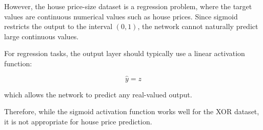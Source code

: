 \documentclass{article}
\begin{document}
However, the house price-size dataset is a regression problem, where the target values are continuous numerical values such as house prices. Since sigmoid restricts the output to the interval $(0,1)$, the network cannot naturally predict large continuous values.

For regression tasks, the output layer should typically use a linear activation function:

\[
\hat{y} = z
\]

which allows the network to predict any real-valued output.

Therefore, while the sigmoid activation function works well for the XOR dataset, it is not appropriate for house price prediction.
\end{document}
